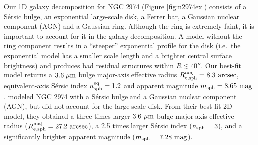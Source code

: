 \documentclass[preprint2]{emulateapj}
\newcommand{\fitfigurewidth}{0.8\textwidth}
\begin{document}
Our 1D galaxy decomposition for NGC 2974 (Figure \ref{fig:n2974ex}) consists of a S\'ersic bulge, an exponential large-scale disk,
a Ferrer bar, a Gaussian nuclear component (AGN) and a Gaussian ring.
Although the ring is extremely faint, it is important to account for it in the galaxy decomposition. 
A model without the ring component results in a ``steeper'' exponential profile for the disk 
(i.e.~the exponential model has a smaller scale length and a brighter central surface brightness) 
and produces bad residual structures within $R \lesssim 40''$.
Our best-fit model returns a $3.6~\rm \mu m$ bulge major-axis effective radius $R_{\rm e,sph}^{\rm maj} = 8.3\rm~arcsec$, 
equivalent-axis S\'ersic index $n_{\rm sph}^{\rm eq} = 1.2$ and apparent magnitude $m_{\rm sph} = 8.65~\rm mag$.
\cite{sani2011} modeled NGC 2974 with a S\'ersic bulge and a Gaussian nuclear component (AGN), 
but did not account for the large-scale disk.
From their best-fit 2D model, they obtained a three times larger 
$3.6~\rm \mu m$ bulge major-axis effective radius ($R_{\rm e,sph}^{\rm maj} = 27.2\rm~arcsec$), 
a 2.5 times larger S\'ersic index ($n_{\rm sph} = 3$),
and a significantly brighter apparent magnitude ($m_{\rm sph} = 7.28~\rm mag$).


\end{document}
